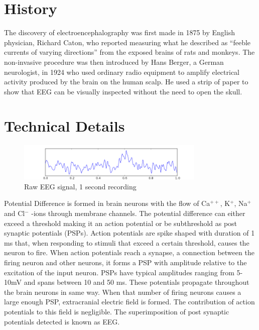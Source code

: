 \documentclass[12pt, a4paper, fleqn]{memoir}%
\begin{document}
\section{History}
The discovery of electroencephalography was first made in 1875 by English physician, Richard Caton, who reported measuring what he described as ``feeble currents of varying directions'' from the exposed brains of rats and monkeys. The non-invasive procedure was then introduced by Hans Berger, a German neurologist, in 1924 who used ordinary radio equipment to amplify electrical activity produced by the brain on the human scalp. He used a strip of paper to show that EEG can be visually inspected without the need to open the skull.

\section{Technical Details}

\begin{figure}[h]
	\centering
	\includegraphics[width=0.8\textwidth]{eeg.png}
	\caption{Raw EEG signal, 1 second recording}
\end{figure}
Potential Difference is formed in brain neurons with the flow of Ca$^{++}$, K$^{+}$, Na$^{+}$ and Cl$^{-}$ -ions through membrane channels. The potential difference can either exceed a threshold making it an action potential or be subthreshold as post synaptic potentials (PSPs). Action potentials are spike shaped with duration of 1 ms that, when responding to stimuli that exceed a certain threshold, causes the neuron to fire. When action potentials reach a synapse, a connection between the firing neuron and other neurons, it forms a PSP with amplitude relative to the excitation of the input neuron. PSPs have typical amplitudes ranging from 5-10mV and spans between 10 and 50 ms. These potentials propagate throughout the brain neurons in same way. When that number of firing neurons causes a large enough PSP, extracranial electric field is formed. The contribution of action potentials to this field is negligible. The superimposition of post synaptic potentials detected is known as EEG.
\end{document}

